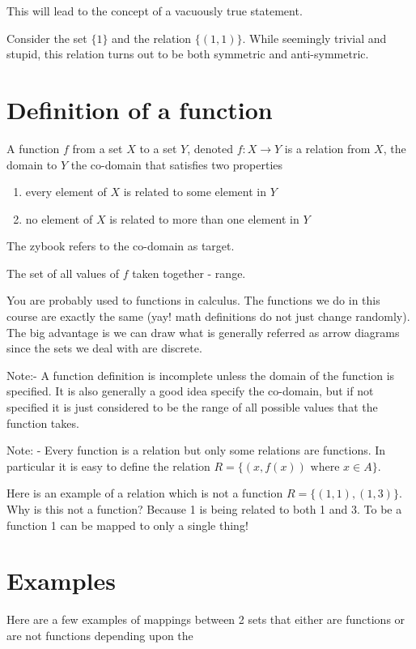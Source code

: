 \documentclass[12pt]{article}
\begin{document}
This will lead to the concept of a vacuously true statement. 

Consider the set $\{1\}$ and the relation $\{(1,1)\}$. While seemingly trivial and stupid, this relation turns out to be both symmetric and anti-symmetric.


\section*{Definition of a function}

A function $f$ from a set $X$ to a set $Y$, denoted $f : X \rightarrow Y$ is a relation from $X$, the domain
to $Y$ the co-domain that satisfies two properties

\begin{enumerate}
\item every element of $X$ is related to some element in $Y$
\item no element of $X$ is related to more than one element in $Y$
\end{enumerate}

The zybook refers to the co-domain as target. 

The set of all values of  $f$ taken together - range. 

You are probably used to functions in calculus. The functions we do in this course are exactly the same (yay! math definitions do not just change randomly). The big advantage is we can draw what is generally referred as arrow diagrams since the sets we deal with are discrete.

Note:- A function definition is incomplete unless the domain of the function is specified. It is also generally a good idea specify the co-domain, but if not specified it is just considered to be the range of all possible values that the function takes.

Note: - Every function is a relation but only some relations are functions. In particular it is easy to define the relation $R = \{(x, f(x)) \text{ where }  x \in A \}$. 

Here is an example of a relation which is not a function $R = \{(1,1), (1,3)\}$. Why is this not a function? Because 1 is being related to both 1 and 3. To be a function 1 can be mapped to only a single thing!

\section*{Examples}

Here are a few examples of mappings between 2 sets that either are functions or are not functions depending upon the 
\end{document}
